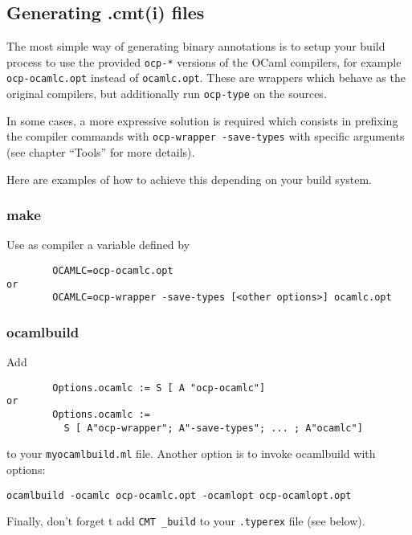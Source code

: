 \subsection{Generating .cmt(i) files}

The most simple way of generating binary annotations is to setup your
build process to use the provided \verb!ocp-*! versions of the OCaml
compilers, for example \verb!ocp-ocamlc.opt! instead of
\verb!ocamlc.opt!.  These are wrappers which behave as the original
compilers, but additionally run \verb!ocp-type! on the sources.

In some cases, a more expressive solution is required which
consists in prefixing the compiler commands with
\verb!ocp-wrapper -save-types! with specific arguments (see chapter
``Tools''
for more details).

Here are examples of how to achieve this depending on your build system.

\subsubsection{make}
Use as compiler a variable defined by
{\verbsize \begin{verbatim}
        OCAMLC=ocp-ocamlc.opt
or
        OCAMLC=ocp-wrapper -save-types [<other options>] ocamlc.opt
\end{verbatim}}


\subsubsection{ocamlbuild}
Add
{\verbsize \begin{verbatim}
        Options.ocamlc := S [ A "ocp-ocamlc"]
or
        Options.ocamlc :=
          S [ A"ocp-wrapper"; A"-save-types"; ... ; A"ocamlc"]
\end{verbatim}}
\noindent to your \verb!myocamlbuild.ml! file.
Another option is to invoke ocamlbuild with options:
{\verbsize \begin{verbatim}
ocamlbuild -ocamlc ocp-ocamlc.opt -ocamlopt ocp-ocamlopt.opt
\end{verbatim}}
\noindent Finally, don't forget t add \verb!CMT _build! to your \verb!.typerex! file
(see below).

